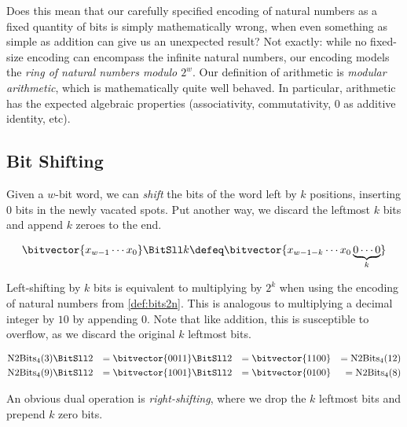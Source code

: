 Does this mean that our carefully specified encoding of natural
numbers as a fixed quantity of bits is simply mathematically wrong,
when even something as simple as addition can give us an unexpected
result?  Not exactly: while no fixed-size encoding can encompass the
infinite natural numbers, our encoding models the \emph{ring
  of natural numbers modulo $2^{w}$}.  Our definition of arithmetic is
\emph{modular arithmetic}, which is mathematically quite well behaved.
In particular, arithmetic has the expected algebraic properties
(associativity, commutativity, $0$ as additive identity, etc).

\subsection{Bit Shifting}
\label{sec:bitshift}

Given a $w$-bit word, we can \emph{shift} the bits of the word left by
$k$ positions, inserting $0$ bits in the newly vacated spots.  Put
another way, we discard the leftmost $k$ bits and append $k$ zeroes to
the end.

\begin{definition}
  \begin{align*}
  \bitvector{x_{w-1}\cdots{}x_{0}} \BitSll k \defeq
  \bitvector{x_{w-1-k}\cdots{}x_{0} \underbrace{0\cdots 0}_{k}}
  \end{align*}
  \label{def:bits-leftshift}
\end{definition}

Left-shifting by $k$ bits is equivalent to multiplying by $2^{k}$ when
using the encoding of natural numbers from \cref{def:bits2n}.  This is
analogous to multiplying a decimal integer by $10$ by appending $0$.
Note that like addition, this is susceptible to overflow, as we
discard the original $k$ leftmost bits.

\begin{example}[Left-shifting bit vectors with $w=4$]
  \begin{align}
    \mathrm{N2Bits}_{4}(3) \BitSll 2 &&= \bitvector{0011} \BitSll 2 &&= \bitvector{1100} &&= \mathrm{N2Bits}_{4}(12) \\
    \mathrm{N2Bits}_{4}(9) \BitSll 2 &&= \bitvector{1001} \BitSll 2 &&= \bitvector{0100} &&= \mathrm{N2Bits}_{4}(8)
  \end{align}
\end{example}

An obvious dual operation is \emph{right-shifting}, where we drop the
$k$ leftmost bits and prepend $k$ zero bits.

